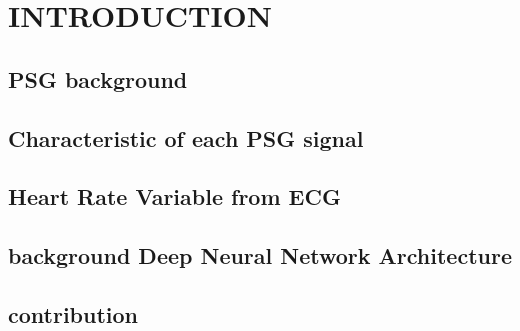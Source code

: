 \chapter{INTRODUCTION}
\section{PSG background}
\section{Characteristic of each PSG signal}
\section{Heart Rate Variable from ECG}
\section{background Deep Neural Network Architecture}
\section{contribution}